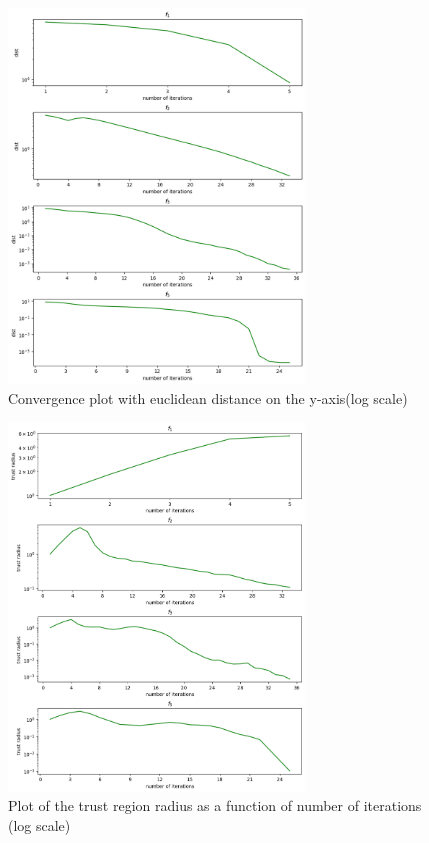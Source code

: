 \documentclass[a4paper]{article}
\begin{document}
\begin{figure}[]
    \centering
    \includegraphics[width=0.7\textwidth]{plt_dist.png}
    \caption{Convergence plot with euclidean distance on the y-axis(log scale)}
  \label{plt1}
\end{figure}

\begin{figure}[]
    \centering
    \includegraphics[width=0.7\textwidth]{plt_radius.png}
    \caption{Plot of the trust region radius as a function of number of
      iterations (log scale)}
  \label{plt2}
\end{figure}
\end{document}
